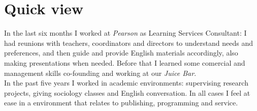 \documentclass[a4paper,hidelinks]{twentysecondcv} %
\begin{document}

\section{Quick view}

In the last six months I worked at \textit{Pearson} as Learning Services Consultant: I had reunions with teachers, coordinators and directors to understand needs and preferences, and then guide and provide English materials accordingly, also making presentations when needed. 
Before that I learned some comercial and management skills co-founding and working at our \textit{Juice Bar}.
\\
In the past five years I worked in academic environments: supervising research projects, giving sociology classes and English conversation. In all cases I feel at ease in a environment that relates to publishing, programming and service.

\end{document}
